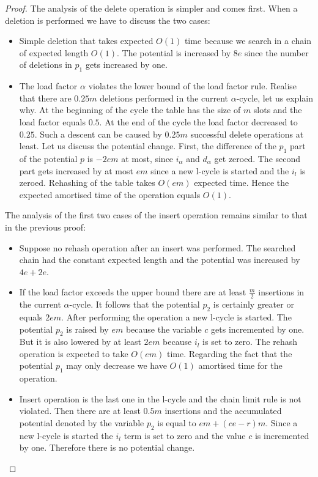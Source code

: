 \begin{proof}
The analysis of the delete operation is simpler and comes first. When a deletion is performed we have to discuss the two cases:
\begin{itemize}
\item Simple deletion that takes expected $O(1)$ time because we search in a chain of expected length $O(1)$. The potential is increased by $8e$ since the number of deletions in $p_1$ gets increased by one.
\item The load factor $\alpha$ violates the lower bound of the load factor rule. Realise that there are $0.25 m$ deletions performed in the current $\alpha$-cycle, let us explain why. At the beginning of the cycle the table has the size of $m$ slots and the load factor equals $0.5$. At the end of the cycle the load factor decreased to $0.25$. Such a descent can be caused by $0.25 m$ successful delete operations at least. Let us discuss the potential change. First, the difference of the $p_1$ part of the potential $p$ is $-2em$ at most, since $i_{\alpha}$ and $d_{\alpha}$ get zeroed. The second part gets increased by at most $em$ since a new l-cycle is started and the $i_l$ is zeroed. Rehashing of the table takes $O(em)$ expected time. Hence the expected amortised time of the operation equals $O(1)$. 
\end{itemize}

The analysis of the first two cases of the insert operation remains similar to that in the previous proof:
\begin{itemize}
\item Suppose no rehash operation after an insert was performed. The searched chain had the constant expected length and the potential was increased by $4e + 2e$.

\item If the load factor exceeds the upper bound there are at least $\frac{m}{2}$ insertions in the current $\alpha$-cycle. It follows that the potential $p_2$ is certainly greater or equals $2em$. After performing the operation a new l-cycle is started. The potential $p_2$ is raised by $em$ because the variable $c$ gets incremented by one. But it is also lowered by at least $2em$ because $i_l$ is set to zero. The rehash operation is expected to take $O(em)$ time. Regarding the fact that the potential $p_1$ may only decrease we have $O(1)$ amortised time for the operation.

\item Insert operation is the last one in the l-cycle and the chain limit rule is not violated. Then there are at least $0.5 m$ insertions and the accumulated potential denoted by the variable $p_2$ is equal to $em + (ce - r)m$. Since a new l-cycle is started the $i_l$ term is set to zero and the value $c$ is incremented by one. Therefore there is no potential change.


\end{itemize}
\end{proof}

